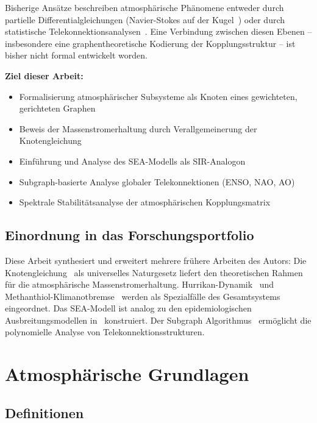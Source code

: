 ﻿\documentclass[a4paper,12pt]{article}
\theoremstyle{definition}
\begin{document}
Bisherige Ans\"atze beschreiben atmosph\"arische Ph\"anomene entweder durch partielle
Differentialgleichungen (Navier-Stokes auf der Kugel~\cite{pedlosky1987}) oder durch
statistische Telekonnektionsanalysen~\cite{trenberth1998}. Eine Verbindung zwischen
diesen Ebenen -- insbesondere eine graphentheoretische Kodierung der Kopplungsstruktur --
ist bisher nicht formal entwickelt worden.

\textbf{Ziel dieser Arbeit:}
\begin{itemize}
    \item Formalisierung atmosph\"arischer Subsysteme als Knoten eines gewichteten,
          gerichteten Graphen
    \item Beweis der Massenstromerhaltung durch Verallgemeinerung der Knotengleichung
    \item Einf\"uhrung und Analyse des SEA-Modells als SIR-Analogon
    \item Subgraph-basierte Analyse globaler Telekonnektionen (ENSO, NAO, AO)
    \item Spektrale Stabili\-t\"atsanalyse der atmosph\"arischen Kopplungsmatrix
\end{itemize}

\subsection{Einordnung in das Forschungsportfolio}

Diese Arbeit synthesiert und erweitert mehrere fr\"uhere Arbeiten des Autors:
Die Knotengleichung~\cite{epp2026knoten} als universelles Naturgesetz liefert
den theoretischen Rahmen f\"ur die atmosph\"arische Massenstromerhaltung.
Hurrikan-Dynamik~\cite{epp2026hurrkne} und Methanthiol-Klimanotbremse~\cite{epp2026mesh}
werden als Spezialf\"alle des Gesamtsystems eingeordnet. Das SEA-Modell ist analog
zu den epidemiologischen Ausbreitungsmodellen in~\cite{epp2026r0,epp2026hantavirus}
konstruiert. Der Subgraph Algorithmus~\cite{epp2026subgraph} erm\"oglicht die
polynomielle Analyse von Telekonnektionsstrukturen.

\section{Atmosph\"arische Grundlagen}

\subsection{Definitionen}
\end{document}

